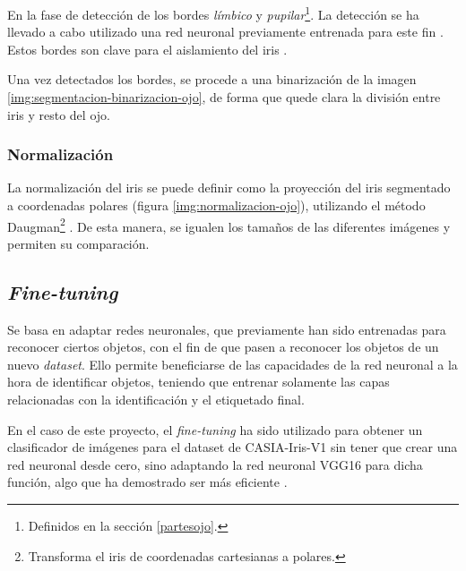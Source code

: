 En la fase de detección de los bordes \textit{límbico} y \textit{pupilar}\footnote{Definidos en la sección \ref{partesojo}.}. La detección se ha llevado a cabo utilizado una red neuronal previamente entrenada para este fin \cite{lozej_end--end_2018}. Estos bordes son clave para el aislamiento del iris \cite{tfg_iris_2020}.




Una vez detectados los bordes, se procede a una binarización de la imagen \ref{img:segmentacion-binarizacion-ojo}, de forma que quede clara la división entre iris y resto del ojo.



\subsubsection{Normalización}\label{subsubsec:normalizacion}

La normalización del iris se puede definir como la proyección del iris segmentado a coordenadas polares (figura \ref{img:normalizacion-ojo}), utilizando el método Daugman\footnote{Transforma el iris de coordenadas cartesianas a polares.} \cite{daugman_normalization_1993}. De esta manera, se igualen los tamaños de las diferentes imágenes y permiten su comparación.



\subsection{\textit{Fine-tuning}}\label{subsec:fine-tuning}
 Se basa en adaptar redes neuronales, que previamente han sido entrenadas para reconocer ciertos objetos, con el fin de que pasen a reconocer los objetos de un nuevo \textit{dataset}. 
 Ello permite beneficiarse de las capacidades de la red neuronal a la hora de identificar objetos, teniendo que entrenar solamente las capas relacionadas con la identificación y el etiquetado final. 
 
 En el caso de este proyecto, el \textit{fine-tuning} ha sido utilizado para obtener un clasificador de imágenes para el dataset de CASIA-Iris-V1 sin tener que crear una red neuronal desde cero, sino adaptando la red
  neuronal VGG16 para dicha función, algo que ha demostrado ser más eficiente \cite{boyd_deep_2020}.

